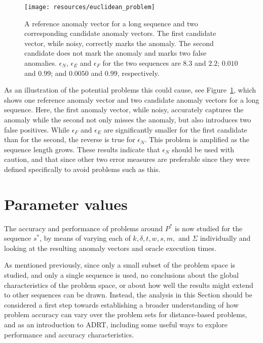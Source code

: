 \begin{figure}[ht]
    \begin{center}
        \texttt{[image: resources/euclidean\_problem]}
    \end{center}
    \caption{\small{A reference anomaly vector for a long sequence and two corresponding candidate anomaly vectors. The first candidate vector, while noisy, correctly marks the anomaly. The second candidate does not mark the anomaly and marks two false anomalies. $\epsilon_N$, $\epsilon_E$ and $\epsilon_F$ for the two sequences are $8.3$ and $2.2$; $0.010$ and $0.99$; and $0.0050$ and $0.99$, respectively.}}
\label{fig:euclidean_problem}
\end{figure}

As an illustration of the potential problems this could cause, see Figure~\ref{fig:euclidean_problem}, which shows one reference anomaly vector and two candidate anomaly vectors for a long sequence. Here, the first anomaly vector, while noisy, accurately captures the anomaly while the second not only misses the anomaly, but also introduces two false positives. While $\epsilon_F$ and $\epsilon_E$ are significantly smaller for the first candidate than for the second, the reverse is true for $\epsilon_N$. This problem is amplified as the sequence length grows. These results indicate that $\epsilon_N$ should be used with caution, and that since other two error measures are preferable since they were defined specifically to avoid problems such as this.


\section{Parameter values}
\label{sect:params}

The accuracy and performance of problems around $P^*$ is now studied for the sequence $s^*$, by means of varying each of $k, \delta, t, w, s, m,$ and $\Sigma$ individually and looking at the resulting anomaly vectors and oracle execution times.

As mentioned previously, since only a small subset of the problem space is studied, and only a single sequence is used, no conclusions about the global characteristics of the problem space, or about how well the results might extend to other sequences can be drawn. Instead, the analysis in this Section should be considered a first step towards establishing a broader understanding of how problem accuracy can vary over the problem sets for distance-based problems, and as an introduction to ADRT, including some useful ways to explore performance and accuracy characteristics.

